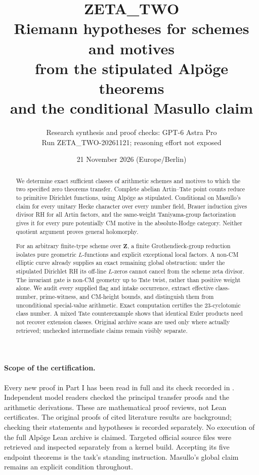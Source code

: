 \documentclass[11pt,a4paper]{article}
\title{\textbf{ZETA\_TWO}\\[0.5em]
Riemann hypotheses for schemes and motives\\
from the stipulated Alp\"oge theorems\\
and the conditional Masullo claim}
\author{Research synthesis and proof checks: GPT-6 Astra Pro\\
\small Run ZETA\_TWO-20261121; reasoning effort not exposed}
\date{21 November 2026 (Europe/Berlin)}
\theoremstyle{definition}
\begin{document}
\maketitle
\begin{abstract}
We determine exact sufficient classes of arithmetic schemes and motives to
which the two specified zero theorems transfer. Complete abelian
Artin--Tate point counts reduce to primitive Dirichlet functions, using
Alp\"oge as stipulated. Conditional on Masullo's claim for every unitary
Hecke character over every number field, Brauer induction gives divisor RH
for all Artin factors, and the same-weight Taniyama-group factorization
gives it for every pure potentially CM motive in the absolute-Hodge category.
Neither quotient argument proves general holomorphy.

For an arbitrary finite-type scheme over $\mathbf Z$, a finite
Grothendieck-group reduction isolates pure geometric $L$-functions and
explicit exceptional local factors. A non-CM elliptic curve already
supplies an exact remaining global obstruction: under the stipulated
Dirichlet RH its off-line $L$-zeros cannot cancel from the scheme zeta
divisor. The invariant gate is non-CM geometry up to Tate twist, rather
than positive weight alone. We audit every supplied flag and intake
occurrence, extract effective class-number, prime-witness, and CM-height
bounds, and distinguish them from unconditional special-value arithmetic.
Exact computation certifies the $23$-cyclotomic class number. A mixed Tate
counterexample shows that identical Euler products need not recover
extension classes. Original archive scans are used only where actually
retrieved; unchecked intermediate claims remain visibly separate.
\end{abstract}

\paragraph{Scope of the certification.}
Every new proof in Part I has been read in full and its check recorded in
. Independent model readers checked the principal
transfer proofs and the arithmetic derivations. These are mathematical
proof reviews, not Lean certificates. The original proofs of cited
literature results are background; checking their statements and
hypotheses is recorded separately. No execution of the full
Alp\"oge Lean archive is claimed. Targeted official source files were
retrieved and inspected separately from a kernel build. Accepting its five endpoint theorems is
the task's standing instruction. Masullo's global claim remains an
explicit condition throughout.
\end{document}

